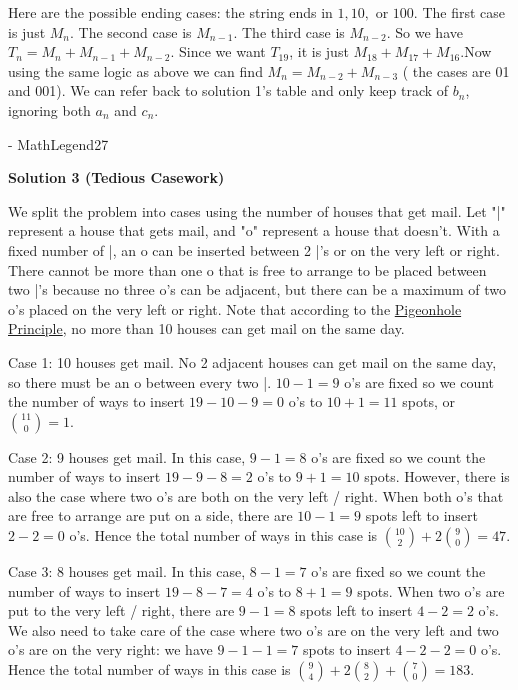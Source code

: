 \begin{enumerate}
 Here are the possible ending cases: the string ends in $1, 10,$ or $100$. The first case is just $M_n$. The second case is $M_{n-1}$. The third case is $M_{n-2}$. So we have $T_n = M_n + M_{n-1} + M_{n-2}$. Since we want $T_{19}$, it is just $M_{18} + M_{17} + M_{16}$.Now using the same logic as above we can find $M_n = M_{n-2} + M_{n-3}$ ( the cases are 01 and 001). We can refer back to solution 1's table and only keep track of $b_n$, ignoring both $a_n$ and $c_n$. 

 - MathLegend27

 


 



\textbf{Solution 3 (Tedious Casework)}

We split the problem into cases using the number of houses that get mail. Let "|" represent a house that gets mail, and "o" represent a house that doesn't. With a fixed number of |, an o can be inserted between 2 |'s or on the very left or right. There cannot be more than one o that is free to arrange to be placed between two |'s because no three o's can be adjacent, but there can be a maximum of two o's placed on the very left or right. Note that according to the \href{https://artofproblemsolving.com/wiki/index.php?title=Pigeonhole\_Principle}{Pigeonhole Principle}, no more than 10 houses can get mail on the same day. 

 Case 1: 10 houses get mail. No 2 adjacent houses can get mail on the same day, so there must be an o between every two |. $10-1=9$ o's are fixed so we count the number of ways to insert $19 - 10 - 9 = 0$ o's to $10+1 = 11$ spots, or $\binom{11}{0} = 1$.

 Case 2: 9 houses get mail. In this case, $9-1 = 8$ o's are fixed so we count the number of ways to insert $19 - 9 - 8 = 2$ o's to $9+1=10$ spots. However, there is also the case where two o's are both on the very left / right. When both o's that are free to arrange are put on a side, there are $10-1=9$ spots left to insert $2-2=0$ o's. Hence the total number of ways in this case is $\binom{10}{2} + 2\binom{9}{0} = 47$.

 Case 3: 8 houses get mail. In this case, $8-1=7$ o's are fixed so we count the number of ways to insert $19-8-7=4$ o's to $8+1=9$ spots. When two o's are put to the very left / right, there are $9-1=8$ spots left to insert $4-2=2$ o's. We also need to take care of the case where two o's are on the very left and two o's are on the very right: we have $9-1-1=7$ spots to insert $4-2-2=0$ o's. Hence the total number of ways in this case is $\binom{9}{4} + 2\binom{8}{2} + \binom{7}{0} = 183$.


\end{enumerate}
